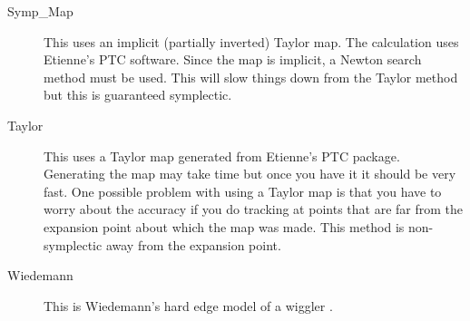 \begin{description}
\item[Symp\_Map]
This uses an implicit (partially inverted) Taylor map. The calculation
uses Etienne's PTC software.  Since the map is implicit, a Newton
search method must be used. This will slow things down from the Taylor
method but this is guaranteed symplectic.

\item[Taylor]
This uses a Taylor map generated from Etienne's PTC
package. Generating the map may take time but once you have it it
should be very fast. One possible problem with using a Taylor map is
that you have to worry about the accuracy if you do tracking at points
that are far from the expansion point about which the map was
made. This method is non-symplectic away from the expansion point. 

\item[Wiedemann]
This is Wiedemann's hard edge model of a wiggler \cite{wiedemann}.

\end{description}

\vfill \break

